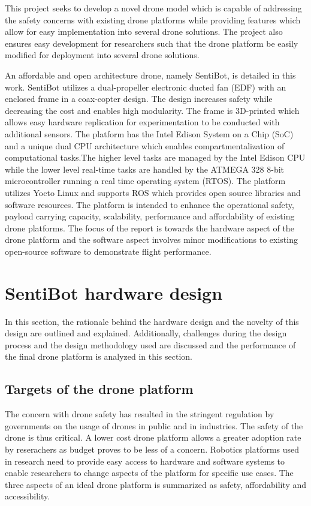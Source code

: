 \documentclass[12pt]{article}
\begin{document}
This project seeks to develop a novel drone model which is capable of addressing the safety concerns with existing drone platforms while providing features which allow for easy implementation into several drone solutions. The project also ensures easy development for researchers such that the drone platform be easily modified for deployment into several drone solutions.

An affordable and open architecture drone, namely SentiBot, is detailed in this work. SentiBot utilizes a dual-propeller electronic ducted fan (EDF) with an enclosed frame in a coax-copter design. The design increases safety while decreasing the cost and enables high modularity. The frame is 3D-printed which allows easy hardware replication for experimentation to be conducted with additional sensors. The platform has the Intel Edison System on a Chip (SoC) and a unique dual CPU architecture which enables compartmentalization of computational tasks.\cite{inteledison}The higher level tasks are managed by the Intel Edison CPU while the lower level real-time tasks are handled by the ATMEGA 328 8-bit microcontroller running a real time operating system (RTOS). The platform utilizes Yocto Linux and supports ROS which provides open source libraries and software resources\cite{ROS}. The platform is intended to enhance the operational safety, payload carrying capacity, scalability, performance and affordability of existing drone platforms. The focus of the report is towards the hardware aspect of the drone platform and the software aspect involves minor modifications to existing open-source software to demonstrate flight performance.

\section{SentiBot hardware design}

In this section, the rationale behind the hardware design and the novelty of this design are outlined and explained. Additionally, challenges during the design process and the design methodology used are discussed and the performance of the final drone platform is analyzed in this section.

\subsection{Targets of the drone platform}

The concern with drone safety has resulted in the stringent regulation by governments on the usage of drones in public and in industries. The safety of the drone is thus critical. A lower cost drone platform allows a greater adoption rate by reserachers as budget proves to be less of a concern.\cite{stateschoolfunding} Robotics platforms used in research need to provide easy access to hardware and software systems to enable researchers to change aspects of the platform for specific use cases\cite{materialrobotics}. The three aspects of an ideal drone platform is summarized as safety, affordability and accessibility. 
\end{document}
